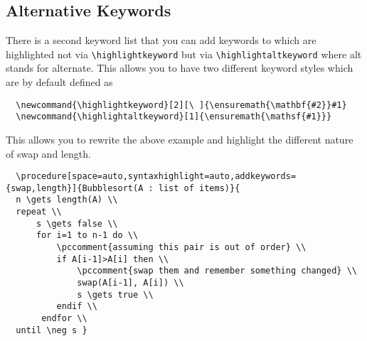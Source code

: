 \documentclass[a4paper]{report}
\begin{document}
  \subsection{Alternative Keywords}
  There is a second keyword list that you can add keywords to which are highlighted not via \lstinline$\highlightkeyword$ but via \lstinline$\highlightaltkeyword$
  where alt stands for alternate. This allows you to have two different keyword styles which are by default defined as
  \begin{lstlisting}
  \newcommand{\highlightkeyword}[2][\ ]{\ensuremath{\mathbf{#2}}#1}
  \newcommand{\highlightaltkeyword}[1]{\ensuremath{\mathsf{#1}}}
  \end{lstlisting}
  This allows you to rewrite the above example and highlight the different nature of swap and length.
  \begin{center}
  \end{center}
  \begin{lstlisting}
  \procedure[space=auto,syntaxhighlight=auto,addkeywords={swap,length}]{Bubblesort(A : list of items)}{
  n \gets length(A) \\
  repeat \\
	  s \gets false \\
	  for i=1 to n-1 do \\
		  \pccomment{assuming this pair is out of order} \\
		  if A[i-1]>A[i] then \\
			  \pccomment{swap them and remember something changed} \\
			  swap(A[i-1], A[i]) \\
			  s \gets true \\
		  endif \\
	   endfor \\
  until \neg s }
  \end{lstlisting}
  
\end{document}
